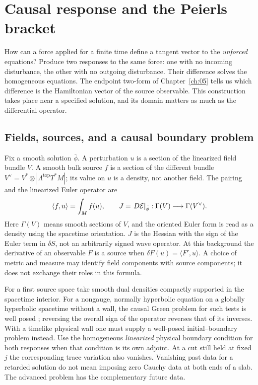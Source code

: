 \chapter{Causal response and the Peierls bracket}\label{ch:06}
How can a force applied for a finite time define a tangent vector to the
\emph{unforced} equations? Produce two responses to the same force: one with
no incoming disturbance, the other with no outgoing disturbance. Their
difference solves the homogeneous equations. The endpoint two-form of
Chapter~\ref{ch:05} tells us which difference is the Hamiltonian vector of
the source observable. This construction takes place near a specified
solution, and its domain matters as much as the differential operator.

\section{Fields, sources, and a causal boundary problem}
Fix a smooth solution $\bar\phi$. A perturbation $u$ is a section of the
linearized field bundle $V$. A smooth bulk source $f$ is a section of the
different bundle $V^\vee=V^*\otimes |\Lambda^{\mathrm{top}}T^*M|$; its value
on $u$ is a density, not another field. The pairing and the linearized Euler
operator are
\[
 \langle f,u\rangle=\int_M f(u),\qquad
 J=\left.D{\cal E}\right|_{\bar\phi}:
           \Gamma(V)\longrightarrow\Gamma(V^\vee).
\]
Here $\Gamma(V)$ means smooth sections of $V$, and the oriented Euler form
is read as a density using the spacetime orientation. $J$ is the Hessian
with the sign of the Euler term in
$\delta S$, not an arbitrarily signed wave operator. At this background the
derivative of an observable $F$ is a source when $\delta F(u)=\langle F',u\rangle$.
A choice of metric and measure may identify field components with source
components; it does not exchange their roles in this formula.

For a first source space take smooth dual densities compactly supported in
the spacetime interior. For a nongauge, normally hyperbolic equation on a
globally hyperbolic spacetime without a wall, the causal Green problem for
such tests is well posed \cite{BGP}; reversing the overall sign of the
operator reverses that of its inverses. With a timelike physical wall one
must supply a well-posed initial--boundary problem instead. Use the
homogeneous \emph{linearized} physical boundary condition for both responses
when that condition is its own adjoint. At a cut still held at fixed $j$ the
corresponding trace variation also vanishes. Vanishing past data for a
retarded solution do not mean imposing zero Cauchy data at both ends of a
slab. The advanced problem has the complementary future data.

